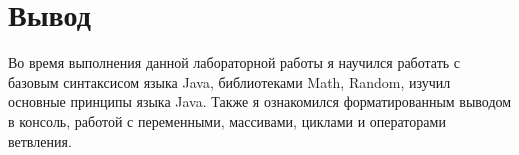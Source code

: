 \section{Вывод}
Во время выполнения данной лабораторной работы я научился работать с базовым синтаксисом языка Java,
библиотеками Math, Random, изучил основные принципы языка Java.
Также я ознакомился форматированным выводом в консоль, работой с переменными, массивами, циклами и операторами ветвления.
